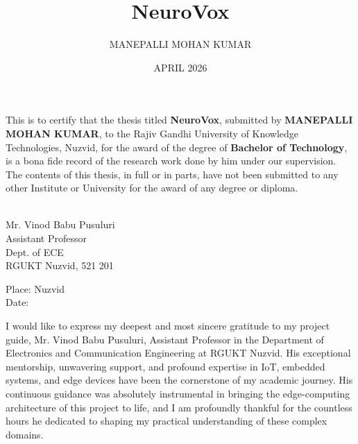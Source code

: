 \documentclass[BTech]{iitmdiss}
\begin{document}
\sloppy
\hypersetup{pageanchor=false}


\title{NeuroVox}

\author{MANEPALLI MOHAN KUMAR}

\date{APRIL 2026}

\maketitle

\certificate

\vspace*{0.5in}

\noindent This is to certify that the thesis titled {\bf NeuroVox}, submitted by {\bf MANEPALLI MOHAN KUMAR}, 
  to the Rajiv Gandhi University of Knowledge Technologies, Nuzvid, for
the award of the degree of {\bf Bachelor of Technology}, is a bona fide
record of the research work done by him under our supervision. The
contents of this thesis, in full or in parts, have not been submitted
to any other Institute or University for the award of any degree or
diploma.

\vspace*{1.5in}

\begin{singlespacing}
\hspace*{-0.25in}
\parbox{2.75in}{\raggedright
{} \\
\noindent Mr. Vinod Babu Pusuluri \\ 
\noindent Assistant Professor \\
\noindent Dept. of ECE\\
\noindent RGUKT Nuzvid, 521 201 \\
}
\end{singlespacing}


\vspace*{0.25in}
\noindent Place: Nuzvid\\
Date:  

\acknowledgements

I would like to express my deepest and most sincere gratitude to my project guide, Mr. Vinod Babu Pusuluri, Assistant Professor in the Department of Electronics and Communication Engineering at RGUKT Nuzvid. His exceptional mentorship, unwavering support, and profound expertise in IoT, embedded systems, and edge devices have been the cornerstone of my academic journey. His continuous guidance was absolutely instrumental in bringing the edge-computing architecture of this project to life, and I am profoundly thankful for the countless hours he dedicated to shaping my practical understanding of these complex domains.
\end{document}
